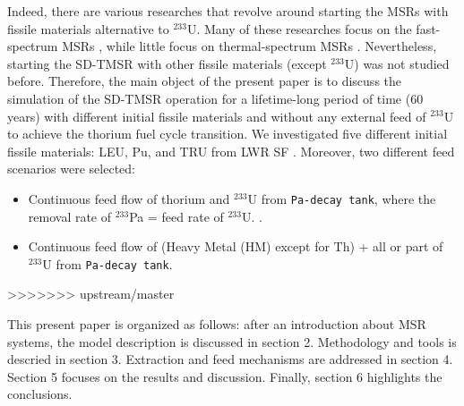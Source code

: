 Indeed, there are various researches that revolve around starting the
\glspl{MSR} with fissile materials alternative to $^{233}$U. Many of these
researches focus on the fast-spectrum \glspl{MSR} \cite{ashraf2019modeling,
ashraf2018nuclear, rykhlevskii_fuel_2019, betzler_impacts_2019,
heuer2014towards,fiorina2013investigation}, while little focus on
thermal-spectrum \glspl{MSR} \cite{betzler2016modeling, zou2018preliminary,
zou2018transition}. Nevertheless, starting the \gls{SD-TMSR} with other
fissile materials (except $^{233}$U) was not studied before. Therefore,
the main object of the present paper is to discuss the simulation of the
\gls{SD-TMSR} operation for a lifetime-long period of time (60 years) with
different initial fissile materials and without any external feed of $^{233}$U
to achieve the thorium fuel cycle transition. We investigated five different
initial fissile materials: \gls{LEU}, Pu, and \gls{TRU} from LWR SF
\cite{de2000scenarios}. Moreover, two different feed scenarios were selected:
\begin{itemize}
	\item Continuous feed flow of thorium and $^{233}$U from \texttt{Pa-decay 
	tank}, where the removal rate of $^{233}$Pa = feed rate of $^{233}$U. 
	\cite{betzler2016modeling}.
	\item Continuous feed flow of (Heavy Metal (HM) except for Th) + all or 
	part of $^{233}$U from \texttt{Pa-decay tank}.
\end{itemize}
>>>>>>> upstream/master

This present paper is organized as follows: after an introduction about 
\gls{MSR} systems, the model description is discussed in section 2. 
Methodology and tools is descried in section 3. Extraction and feed mechanisms 
are addressed in section 4. Section 5 focuses on the results and discussion. 
Finally, section 6 highlights the conclusions.




